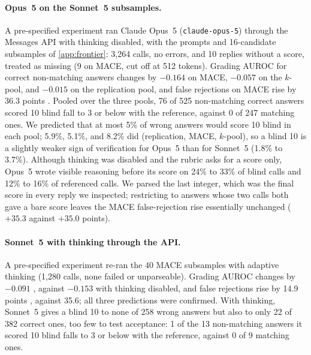 \paragraph{Opus~5 on the Sonnet~5 subsamples.}
A pre-specified experiment ran Claude Opus~5 (\texttt{claude-opus-5}) through the Messages API with thinking disabled, with the prompts and 16-candidate subsamples of \cref{app:frontier}: 3,264 calls, no errors, and 10 replies without a score, treated as missing (9 on \textsc{MACE}, cut off at 512 tokens). Grading AUROC for correct non-matching answers changes by $-0.164$  on \textsc{MACE}, $-0.057$  on the $k$-pool, and $-0.015$  on the replication pool, and false rejections on \textsc{MACE} rise by 36.3 points . Pooled over the three pools, 76 of 525 non-matching correct answers scored 10 blind fall to 3 or below with the reference, against 0 of 247 matching ones. We predicted that at most 5\% of wrong answers would score 10 blind in each pool; 5.9\%, 5.1\%, and 8.2\% did (replication, \textsc{MACE}, $k$-pool), so a blind 10 is a slightly weaker sign of verification for Opus~5 than for Sonnet~5 (1.8\% to 3.7\%). Although thinking was disabled and the rubric asks for a score only, Opus~5 wrote visible reasoning before its score on 24\% to 33\% of blind calls and 12\% to 16\% of referenced calls. We parsed the last integer, which was the final score in every reply we inspected; restricting to answers whose two calls both gave a bare score leaves the \textsc{MACE} false-rejection rise essentially unchanged ($+35.3$ against $+35.0$ points).\ph

\paragraph{Sonnet~5 with thinking through the API.}
A pre-specified experiment re-ran the 40 \textsc{MACE} subsamples with adaptive thinking (1,280 calls, none failed or unparseable). Grading AUROC changes by $-0.091$ , against $-0.153$ with thinking disabled, and false rejections rise by 14.9 points , against 35.6; all three predictions were confirmed. With thinking, Sonnet~5 gives a blind 10 to none of 258 wrong answers but also to only 22 of 382 correct ones, too few to test acceptance: 1 of the 13 non-matching answers it scored 10 blind falls to 3 or below with the reference, against 0 of 9 matching ones.

